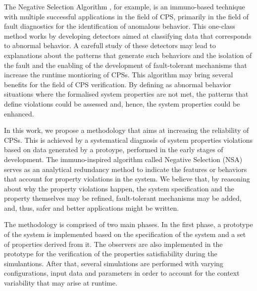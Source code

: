 The Negative Selection Algorithm \cite{ICBook2009}, for example, is an immuno-based technique with multiple successful applications in the field of CPS, primarily in the field of fault diagnostics for the identification of anomalous behavior. This one-class method works by developing detectors aimed at classifying data that corresponds to abnormal behavior. A carefull study of these detectors may lead to explanations about the patterns that generate such behaviors and the isolation of the fault and the enabling of the development of fault-tolerant mechanisms that increase the runtime montioring of CPSs. This algorithm may bring several benefits for the field of CPS verification. By defining as abnormal behavior situations where the formalised system properties are not met, the patterns that define violations could be assessed and, hence, the system properties could be enhanced. 

In this work, we propose a methodology that aims at increasing the reliability of CPSs. This is achieved by a systematical diagnosis of system properties violations based on data generated by a protoype, performed in the early stages of development. The immuno-inspired algorithm called Negative Selection (NSA) serves as an analytical redundancy method to indicate the features or behaviors that account for property violations in the system. We believe that, by reasoning about why the property violations happen, the system specification and the property themselves may be refined, fault-tolerant mechanisms may be added, and, thus, safer and better applications might be written.

The methodology is comprised of two main phases. In the first phase, a prototype of the system is implemented based on the specification of the system and a set of properties derived from it. The observers are also implemented in the prototype for the verification of the properties satisfiability during the simulantions. After that, several simulations are performed with varying configurations, input data and parameters in order to account for the context variability that may arise at runtime. 



